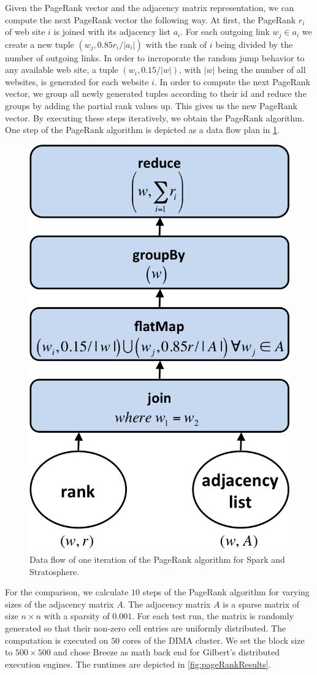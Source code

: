 Given the PageRank vector and the adjacency matrix representation, we can compute the next PageRank vector the following way.
At first, the PageRank $r_i$ of web site $i$ is joined with its adjacency list $a_i$.
For each outgoing link $w_j \in a_i$ we create a new tuple $(w_j, 0.85r_i/\left|a_i\right|)$ with the rank of $i$ being divided by the number of outgoing links.
In order to incroporate the random jump behavior to any available web site, a tuple $(w_i, 0.15/|w|)$, with $|w|$ being the number of all websites, is generated for each website $i$.
In order to compute the next PageRank vector, we group all newly generated tuples according to their id and reduce the groups by adding the partial rank values up.
This gives us the new PageRank vector.
By executing these steps iteratively, we obtain the PageRank algorithm.
One step of the PageRank algorithm is depicted as a data flow plan in \cref{fig:pageRankDataFlow}.

\begin{figure}[!h]
	\centering
	\includegraphics[width=.3\linewidth]{images/pageRankStep.png}
	\caption{Data flow of one iteration of the PageRank algorithm for Spark and Stratosphere.}
	\label{fig:pageRankDataFlow}
\end{figure}

For the comparison, we calculate $10$ steps of the PageRank algorithm for varying sizes of the adjacency matrix $A$.
The adjacency matrix $A$ is a sparse matrix of size $n \times n$ with a sparsity of $0.001$.
For each test run, the matrix is randomly generated so that their non-zero cell entries are uniformly distributed.
The computation is executed on $50$ cores of the DIMA cluster.
We set the block size to $500 \times 500$ and chose Breeze as math back end for Gilbert's distributed execution engines.
The runtimes are depicted in \cref{fig:pageRankResults}.

